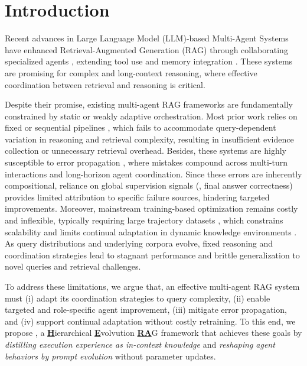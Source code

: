 \section{Introduction}
\label{sec:intro}
\vspace{-2pt}
Recent advances in Large Language Model (LLM)-based Multi-Agent Systems \citep{li2024survey} have enhanced Retrieval-Augmented Generation (RAG) \citep{lewis2020retrieval, gao2023retrieval, jiang2023active} through  collaborating specialized agents \citep{nguyen2025ma, liu2025hm, qian2024scaling, chen2025improving}, extending  tool use \citep{zhuang2023toolchain, schick2023toolformer, jin2025search} and memory integration \citep{hu2025memory, gutierrez2025rag, yang2025improving}. These systems are promising for complex and long-context reasoning, where effective coordination between retrieval and reasoning is critical. 

Despite their promise, existing multi-agent RAG frameworks are fundamentally constrained by static or weakly adaptive orchestration. Most prior work relies on fixed or sequential pipelines \citep{gamage2024multi, liu2025hm, yao2022react, qian2024scaling, chen2025improving}, which fails to accommodate query-dependent variation in reasoning and retrieval complexity, resulting in insufficient evidence collection or unnecessary retrieval overhead. Besides, these systems are highly susceptible to error propagation \citep{shen2025understanding, pei2025scope}, where mistakes compound across multi-turn interactions and long-horizon agent coordination. Since these errors are inherently compositional, reliance on global supervision signals (\eg, final answer correctness) \citep{chen2025improving, song2025r1old, song2025r1} provides limited attribution to specific failure sources, hindering targeted improvements. Moreover, mainstream training-based optimization remains costly and inflexible, typically requiring large trajectory datasets \citep{zhu2024information, chen2025improving, chen2025mao, zhu2024atm, jin2025search}, which constrains scalability and limits continual adaptation in dynamic knowledge environments \citep{tang2025adapting}. As query distributions and underlying corpora evolve, fixed reasoning and coordination strategies \citep{jeong2024adaptive} lead to stagnant performance and brittle generalization to novel queries and retrieval challenges.

To address these limitations, we argue that, an effective multi-agent RAG system must (i) adapt its coordination strategies to query complexity, (ii) enable targeted and role-specific agent improvement, (iii) mitigate error propagation, and (iv) support continual adaptation without costly retraining. To this end, we propose \hero, a \underline{\textbf{H}}ierarchical \underline{\textbf{E}}volvution \underline{\textbf{RA}}G framework that achieves these goals by \textit{distilling execution experience as in-context knowledge} and \textit{reshaping agent behaviors by prompt evolution} without parameter updates. 

